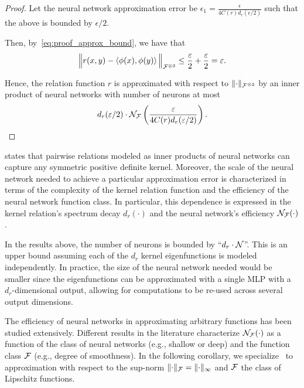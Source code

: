 \begin{proof}
	Let the neural network approximation error be $\epsilon_1 = \frac{\epsilon}{4 C(r) d_r(\epsilon / 2)}$ such that the above is bounded by $\epsilon / 2$. 

	Then, by~\eqref{eq:proof_approx_bound}, we have that
	\begin{equation*}
			\bignorm{r(x,y) - \iprod{\phi(x)}{\phi(y)}}_{\calF^{\otimes 2}} \leq \frac{\epsilon}{2} + \frac{\epsilon}{2} = \epsilon.
	\end{equation*}

	Hence, the relation function $r$ is approximated with respect to $\lVert\cdot\rVert_{{\mathcal{F}}^{\otimes 2}}$ by an inner product of neural networks with number of neurons at most 
	\[d_r(\varepsilon / 2) \cdot {\mathcal{N}}_{\mathcal{F}}\left(\frac{\varepsilon}{4 C(r) d_r(\varepsilon / 2)}\right).\]

\end{proof}

 states that pairwise relations modeled as inner products of neural networks can capture any symmetric positive definite kernel. Moreover, the scale of the neural network needed to achieve a particular approximation error is characterized in terms of the complexity of the kernel relation function and the efficiency of the neural network function class. In particular, this dependence is expressed in the kernel relation's spectrum decay $d_r(\cdot)$ and the neural network's efficiency ${\mathcal{N}}_{\mathcal{F}}(\cdot)$.

\begin{remark}
	In the results above, the number of neurons is bounded by ``$d_r \cdot {\mathcal{N}}$''. This is an upper bound assuming each of the $d_r$ kernel eigenfunctions is modeled independently. In practice, the size of the neural network needed would be smaller since the eigenfunctions can be approximated with a single MLP with a $d_r$-dimensional output, allowing for computations to be re-used across several output dimensions.
\end{remark}

The efficiency of neural networks in approximating arbitrary functions has been studied extensively. Different results in the literature characterize ${\mathcal{N}}_{{\mathcal{F}}}(\cdot)$ as a function of the class of neural networks (e.g., shallow or deep) and the function class ${\mathcal{F}}$ (e.g., degree of smoothness). In the following corollary, we specialize~ to approximation with respect to the sup-norm $\lVert\cdot\rVert_{\mathcal{F}} = \lVert\cdot\rVert_\infty$ and ${\mathcal{F}}$ the class of Lipschitz functions.


